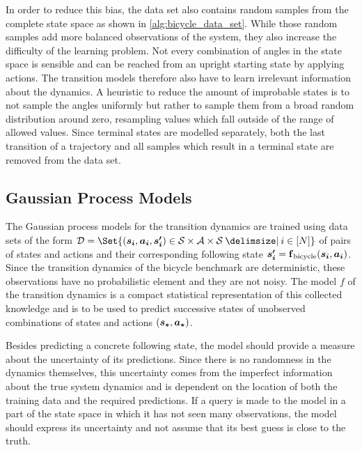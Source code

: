 In order to reduce this bias, the data set also contains random samples from the complete state space as shown in \cref{alg:bicycle_data_set}.
While those random samples add more balanced observations of the system, they also increase the difficulty of the learning problem.
Not every combination of angles in the state space is sensible and can be reached from an upright starting state by applying actions.
The transition models therefore also have to learn irrelevant information about the dynamics.
A heuristic to reduce the amount of improbable states is to not sample the angles uniformly but rather to sample them from a broad random distribution around zero, resampling values which fall outside of the range of allowed values.
Since terminal states are modelled separately, both the last transition of a trajectory and all samples which result in a terminal state are removed from the data set.

\subsection{Gaussian Process Models}
The Gaussian process models for the transition dynamics are trained using data sets of the form $\D = \Set{(\mat{s_i}, \mat{a_i}, \mat{s_i^\prime}) \in \Es \times \Ah \times \Es \with i \in [N]}$ of pairs of states and actions and their corresponding following state $\bm{s_i^\prime} = \operatorname{\operatorname{\mathbf{f}}_{\text{bicycle}}}(\bm{s_i}, \bm{a_i})$.
Since the transition dynamics of the bicycle benchmark are deterministic, these observations have no probabilistic element and they are not noisy.
The model $f$ of the transition dynamics is a compact statistical representation of this collected knowledge and is to be used to predict successive states of unobserved combinations of states and actions $(\bm{s_\ast}, \bm{a_\ast})$.

Besides predicting a concrete following state, the model should provide a measure about the uncertainty of its predictions.
Since there is no randomness in the dynamics themselves, this uncertainty comes from the imperfect information about the true system dynamics and is dependent on the location of both the training data and the required predictions.
If a query is made to the model in a part of the state space in which it has not seen many observations, the model should express its uncertainty and not assume that its best guess is close to the truth.

